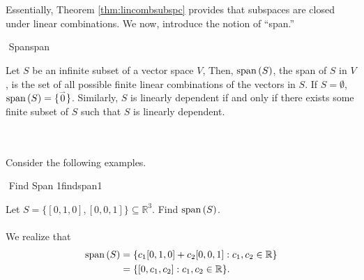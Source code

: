         \vphantom
        \\
        \\
        Essentially, Theorem \ref{thm:lincombsubspc} provides that subspaces are closed under linear combinations. We now, introduce the notion of ``span.''
        \begin{definition}{\Stop\,\,Span}{span}

            Let \(S\) be an infinite subset of a vector space \(V\), Then, \(\text{span\,}(S)\), the span of \(S\) in \(V\), is the set of all possible finite linear combinations of the vectors in \(S\). If \(S=\emptyset\), \(\text{span\,}(S)=\{\overset{_{\rightharpoonup}}{0}\}\). Similarly, \(S\) is linearly dependent if and only if there exists some finite subset of 
            \(S\) such that \(S\) is linearly dependent.
            
        \end{definition}
        \pagebreak
        \vphantom
        \\
        \\
        Consider the following examples.
        \begin{example}{\Difficulty\,\,Find Span 1}{findspan1}
            
            Let \(S=\{[0,1,0],[0,0,1]\}\subseteq \mathbb{R}^3\). Find \(\text{span\,}(S)\).
            \\
            \\
            We realize that
            \begin{align*}
                \text{span\,}(S)&=\{c_1[0,1,0]+c_2[0,0,1]:c_1,c_2\in\mathbb{R}\} \\
                &=\{[0,c_1,c_2]:c_1,c_2\in\mathbb{R}\}.
            \end{align*}

        \end{example}
